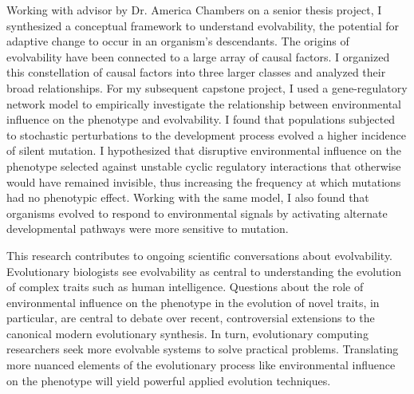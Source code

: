 Working with advisor by Dr. America Chambers on a senior thesis project, I synthesized a conceptual framework to understand evolvability, the potential for adaptive change to occur in an organism's descendants.
The origins of evolvability have been connected to a large array of causal factors.
I organized this constellation of causal factors into three larger classes and analyzed their broad relationships.
For my subsequent capstone project, I used a gene-regulatory network model to empirically investigate the relationship between environmental influence on the phenotype and evolvability.
I found that populations subjected to stochastic perturbations to the development process evolved a higher incidence of silent mutation.
I hypothesized that disruptive environmental influence on the phenotype selected against unstable cyclic regulatory interactions that otherwise would have remained invisible, thus increasing the frequency at which mutations had no phenotypic effect.
Working with the same model, I also found that organisms evolved to respond to environmental signals by activating alternate developmental pathways were more sensitive to mutation.

This research contributes to ongoing scientific conversations about evolvability.
Evolutionary biologists see evolvability as central to understanding the evolution of complex traits such as human intelligence.
Questions about the role of environmental influence on the phenotype in the evolution of novel traits, in particular, are central to debate over recent, controversial extensions to the canonical modern evolutionary synthesis.
In turn, evolutionary computing researchers seek more evolvable systems to solve practical problems.
Translating more nuanced elements of the evolutionary process like environmental influence on the phenotype will yield powerful applied evolution techniques.
